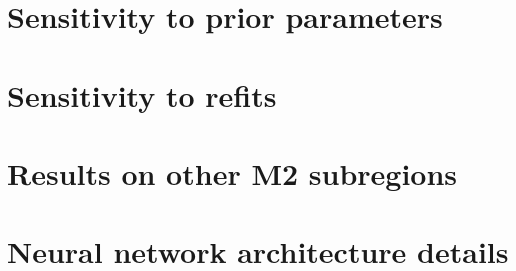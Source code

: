 \documentclass[twoside,11pt]{article}
\begin{document}
\section{Sensitivity to prior parameters}
\label{sec:prior_sensitivity}


\section{Sensitivity to refits}
\label{sec:refits}


\section{Results on other M2 subregions}
\label{sec:test_m2}



% 

\section{Neural network architecture details}
\label{sec:supp_nn_architecture}



\clearpage

\vskip 0.2in

\end{document}
